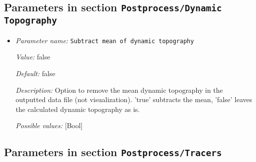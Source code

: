 \subsection{Parameters in section \tt Postprocess/Dynamic Topography}
\label{parameters:Postprocess/Dynamic_20Topography}

\begin{itemize}
\item {\it Parameter name:} {\tt Subtract mean of dynamic topography}
\label{parameters:Postprocess/Dynamic Topography/Subtract mean of dynamic topography}


{\it Value:} false


{\it Default:} false


{\it Description:} Option to remove the mean dynamic topography in the outputted data file (not visualization). 'true' subtracts the mean, 'false' leaves the calculated dynamic topography as is. 


{\it Possible values:} [Bool]
\end{itemize}

\subsection{Parameters in section \tt Postprocess/Tracers}
\label{parameters:Postprocess/Tracers}

